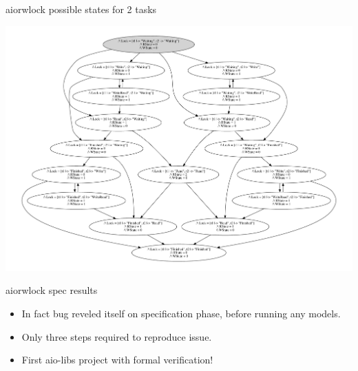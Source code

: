 \documentclass[12pt]{beamer}
\begin{document}
  \begin{frame}{aiorwlock possible states for 2 tasks}
      \begin{center}
          \includegraphics[scale=0.35,angle=90]{figures/aiorwlock_model}
      \end{center}
  \end{frame}
  \begin{frame}{aiorwlock spec results}
    \begin{itemize}
      \item In fact bug reveled itself on specification phase, before
          running any models.
      \item Only three steps required to reproduce issue.
      \item First aio-libs project with formal verification!
    \end{itemize}
  \end{frame}
\end{document}
